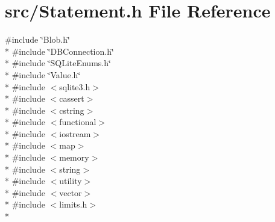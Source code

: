 \hypertarget{a00032}{\section{src/\-Statement.h File Reference}
\label{a00032}
}
{\ttfamily \#include \char`\"{}Blob.\-h\char`\"{}}\\*
{\ttfamily \#include \char`\"{}D\-B\-Connection.\-h\char`\"{}}\\*
{\ttfamily \#include \char`\"{}S\-Q\-Lite\-Enums.\-h\char`\"{}}\\*
{\ttfamily \#include \char`\"{}Value.\-h\char`\"{}}\\*
{\ttfamily \#include $<$sqlite3.\-h$>$}\\*
{\ttfamily \#include $<$cassert$>$}\\*
{\ttfamily \#include $<$cstring$>$}\\*
{\ttfamily \#include $<$functional$>$}\\*
{\ttfamily \#include $<$iostream$>$}\\*
{\ttfamily \#include $<$map$>$}\\*
{\ttfamily \#include $<$memory$>$}\\*
{\ttfamily \#include $<$string$>$}\\*
{\ttfamily \#include $<$utility$>$}\\*
{\ttfamily \#include $<$vector$>$}\\*
{\ttfamily \#include $<$limits.\-h$>$}\\*
